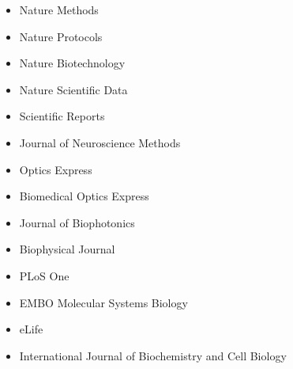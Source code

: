 \begin{itemize}
\item Nature Methods
\item Nature Protocols
\item Nature Biotechnology
\item Nature Scientific Data
\item Scientific Reports
\item Journal of Neuroscience Methods
\item Optics Express
\item Biomedical Optics Express
\item Journal of Biophotonics
\item Biophysical Journal
\item PLoS One
\item EMBO Molecular Systems Biology 
\item eLife
\item International Journal of Biochemistry and Cell Biology
\end{itemize}